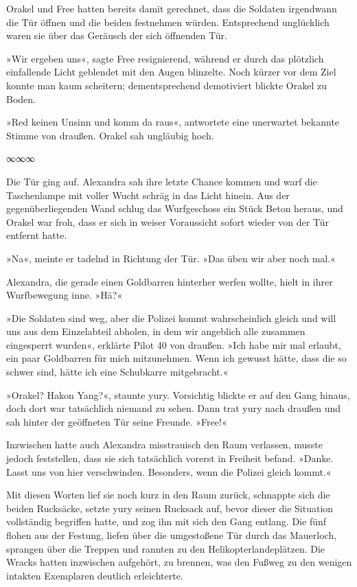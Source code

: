 Orakel und Free hatten bereits damit gerechnet, dass die Soldaten irgendwann die Tür öffnen und die beiden festnehmen würden. Entsprechend unglücklich waren sie über das Geräusch der sich öffnenden Tür.

»Wir ergeben uns«, sagte Free resignierend, während er durch das plötzlich einfallende Licht geblendet mit den Augen blinzelte. Noch kürzer vor dem Ziel konnte man kaum scheitern; dementsprechend demotiviert blickte Orakel zu Boden.

»Red keinen Unsinn und komm da raus«, antwortete eine unerwartet bekannte Stimme von draußen. Orakel sah ungläubig hoch.

\begin{center}
    ∞∞∞
\end{center}

Die Tür ging auf. Alexandra sah ihre letzte Chance kommen und warf die Taschenlampe mit voller Wucht schräg in das Licht hinein. Aus der gegenüberliegenden Wand schlug das Wurfgeschoss ein Stück Beton heraus, und Orakel war froh, dass er sich in weiser Voraussicht sofort wieder von der Tür entfernt hatte.

»Na«, meinte er tadelnd in Richtung der Tür. »Das üben wir aber noch mal.«

Alexandra, die gerade einen Goldbarren hinterher werfen wollte, hielt in ihrer Wurfbewegung inne. »Hä?«

»Die Soldaten sind weg, aber die Polizei kommt wahrscheinlich gleich und will uns aus dem Einzelabteil abholen, in dem wir angeblich alle zusammen eingesperrt wurden«, erklärte Pilot 40 von draußen. »Ich habe mir mal erlaubt, ein paar Goldbarren für mich mitzunehmen. Wenn ich gewusst hätte, dass die so schwer sind, hätte ich eine Schubkarre mitgebracht.«

»Orakel? Hakon Yang?«, staunte yury. Vorsichtig blickte er auf den Gang hinaus, doch dort war tatsächlich niemand zu sehen. Dann trat yury nach draußen und sah hinter der geöffneten Tür seine Freunde. »Free!«

Inzwischen hatte auch Alexandra misstrauisch den Raum verlassen, musste jedoch feststellen, dass sie sich tatsächlich vorerst in Freiheit befand. »Danke. Lasst uns von hier verschwinden. Besonders, wenn die Polizei gleich kommt.«

Mit diesen Worten lief sie noch kurz in den Raum zurück, schnappte sich die beiden Rucksäcke, setzte yury seinen Rucksack auf, bevor dieser die Situation vollständig begriffen hatte, und zog ihn mit sich den Gang entlang. Die fünf flohen aus der Festung, liefen über die umgestoßene Tür durch das Mauerloch, sprangen über die Treppen und rannten zu den Helikopterlandeplätzen. Die Wracks hatten inzwischen aufgehört, zu brennen, was den Fußweg zu den wenigen intakten Exemplaren deutlich erleichterte.

